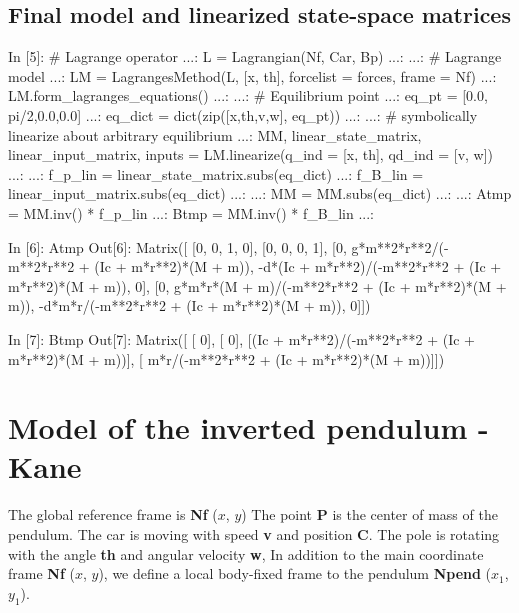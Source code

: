 \subsection{Final model and linearized state-space matrices}
\begin{code}
In [5]: # Lagrange operator
   ...: L = Lagrangian(Nf, Car, Bp)
   ...: 
   ...: # Lagrange model
   ...: LM = LagrangesMethod(L, [x, th], forcelist = forces, frame = Nf)
   ...: LM.form_lagranges_equations()
   ...: 
   ...: # Equilibrium point
   ...: eq_pt = [0.0, pi/2,0.0,0.0]
   ...: eq_dict = dict(zip([x,th,v,w], eq_pt))
   ...: 
   ...: # symbolically linearize about arbitrary equilibrium
   ...: MM, linear_state_matrix, linear_input_matrix, inputs = LM.linearize(q_ind = [x, th], qd_ind = [v, w])
   ...: 
   ...: f_p_lin = linear_state_matrix.subs(eq_dict)
   ...: f_B_lin = linear_input_matrix.subs(eq_dict)
   ...: 
   ...: MM = MM.subs(eq_dict)
   ...: 
   ...: Atmp = MM.inv() * f_p_lin
   ...: Btmp = MM.inv() * f_B_lin
   ...: 
\end{code}

\begin{code}
In [6]: Atmp
Out[6]: 
Matrix([
[0,                                                  0,                                                     1, 0],
[0,                                                  0,                                                     0, 1],
[0,   g*m**2*r**2/(-m**2*r**2 + (Ic + m*r**2)*(M + m)), -d*(Ic + m*r**2)/(-m**2*r**2 + (Ic + m*r**2)*(M + m)), 0],
[0, g*m*r*(M + m)/(-m**2*r**2 + (Ic + m*r**2)*(M + m)),           -d*m*r/(-m**2*r**2 + (Ic + m*r**2)*(M + m)), 0]])
\end{code}

\begin{code}
In [7]: Btmp
Out[7]: 
Matrix([
[                                                 0],
[                                                 0],
[(Ic + m*r**2)/(-m**2*r**2 + (Ic + m*r**2)*(M + m))],
[          m*r/(-m**2*r**2 + (Ic + m*r**2)*(M + m))]])
\end{code}

\section{Model of the inverted pendulum - Kane}

The global reference frame is \textbf{Nf} ($x$, $y$)
The point \textbf{P} is the center of mass of the pendulum. The car is moving 
with speed \textbf{v} and position \textbf{C}.
The pole is rotating with the angle \textbf{th} and angular velocity 
\textbf{w}, 
In addition to the main coordinate frame \textbf{Nf} ($x$, $y$), we define a 
local body-fixed frame to the pendulum \textbf{Npend} ($x_1$, $y_1$).

